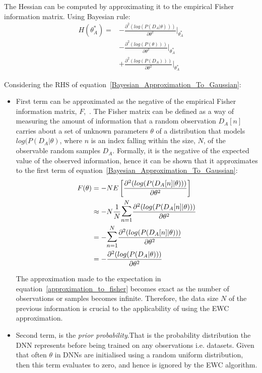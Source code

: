 The Hessian can be computed by approximating it to the empirical Fisher information matrix.
%
Using Bayesian rule: 
\begin{equation} \label{Bayesian_Approximation_To_Gaussian}
\begin{split}
    H(\theta^*_A) = &-\frac{\partial^2(log(P(D_A|\theta)))}{\partial\theta^2}\Bigg|_{\theta^*_A}
    \\
    & - \frac{\partial^2(log(P(\theta)))}{\partial\theta^2}\Bigg|_{\theta^*_A} 
    \\
    & + \frac{\partial^2(log(P(D_A)))}{\partial\theta^2}\Bigg|_{\theta^*_A}
\end{split}
\end{equation}

\noindent Considering the RHS of equation~\ref{Bayesian_Approximation_To_Gaussian}:
\begin{itemize}
    \item First term can be approximated as the negative of the empirical Fisher information matrix, $F$,~\cite{Kay1993,Ly2017,Martens2020}. 
    The Fisher matrix can be defined as a way of measuring the amount of information that a random observation
    $D_A[n]$ carries about a set of unknown parameters $\theta$ of a distribution that models $log(P(D_A|\theta)$, where $n$ is an index falling within the size, $N$, of the observable random samples $D_A$. 
    Formally, it is the negative of the expected value of the observed information, hence it can be shown that it approximates to the first term of equation~\ref{Bayesian_Approximation_To_Gaussian}: 
%
    \begin{equation} \label{approximation_to_fisher}
    \begin{split}
    F(\theta) &= -N E\left[\frac{\partial^2(log(P(D_A[n]|\theta)))}{\partial\theta^2}\right]
    \\
    & \approx -N \frac{1}{N}\mathlarger{\mathlarger{\sum}}_{n=1}^{N} \frac{\partial^2(log(P(D_A[n]|\theta)))}{\partial\theta^2}
    \\
    &
    = -\mathlarger{\mathlarger{\sum}}_{n=1}^{N} \frac{\partial^2(log(P(D_A[n]|\theta)))}{\partial\theta^2} 
    \\
    &
    = -\frac{\partial^2(log(P(D_A|\theta)))}{\partial\theta^2} 
    \end{split}
    \end{equation}
    
    \noindent The approximation made to the expectation in equation~\ref{approximation_to_fisher} becomes exact as the number of observations or samples becomes infinite.
    Therefore, the data size $N$ of the previous information is crucial to the applicability of using the EWC approximation.
%
    \item Second term, is the \textit{prior probability}.That is the probability distribution the DNN represents before being trained on any observations i.e. datasets.
    Given that often $\theta$ in DNNs are initialised using a random uniform distribution, then this term evaluates to zero, and hence is ignored by the EWC algorithm.
    

\end{itemize}
